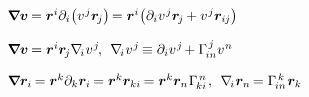 \begin{otherlanguage}{russian}
$\bm{\nabla}\hspace{-0.2ex} \bm{v} \hspace{-0.16ex}
= \bm{r}^{i} \partial_i \hspace{-0.32ex} \left( v^{\hspace{.12ex}j} \bm{r}_{\hspace{-0.2ex}j} \right) \hspace{-0.25ex}
= \bm{r}^{i} \hspace{-0.32ex} \left( \partial_i v^{\hspace{.12ex}j} \bm{r}_{\hspace{-0.2ex}j} \hspace{-0.12ex} + v^{\hspace{.12ex}j} \bm{r}_{i\hspace{-0.1ex}j} \right)$

$\bm{\nabla}\hspace{-0.2ex} \bm{v} \hspace{-0.16ex}
= \bm{r}^{i} \bm{r}_{\hspace{-0.2ex}j} \nabla_{\hspace{-0.32ex}i\hspace{.1ex}} v^{\hspace{.12ex}j} \hspace{-0.25ex} , \:\:
\nabla_{\hspace{-0.32ex}i\hspace{.1ex}} v^{\hspace{.12ex}j} \hspace{-0.2ex} \equiv
\partial_i v^{\hspace{.12ex}j} \hspace{-0.25ex} + \Gamma_{\hspace{-0.25ex}in}^{\hspace{.25ex}j} v^{\hspace{.1ex}n}$

$\bm{\nabla}\hspace{-0.2ex} \bm{r}_i \hspace{-0.2ex}
= \bm{r}^k \partial_k \bm{r}_i \hspace{-0.2ex}
= \bm{r}^k \bm{r}_{ki} \hspace{-0.2ex}
= \bm{r}^k \bm{r}_n \hspace{.1ex} \Gamma_{\hspace{-0.25ex}ki}^{\hspace{.25ex}n}
\hspace{.2ex} , \:\:
\nabla_{\hspace{-0.32ex}i\hspace{.1ex}} \bm{r}_{n} \hspace{-0.25ex}
= \Gamma_{\hspace{-0.25ex}in}^{\hspace{.25ex}k} \hspace{.16ex} \bm{r}_k$


\end{otherlanguage}
